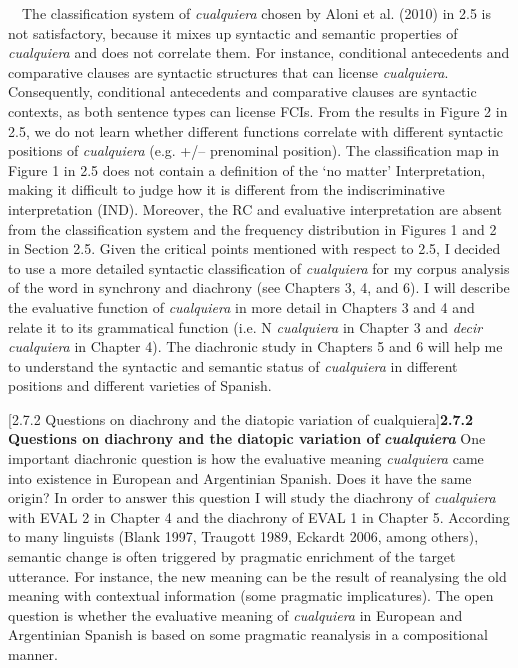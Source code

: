 \documentclass[10pt]{article}
\makeatletter
\renewcommand\subsubsection{\@startsection{subsubsection}{3}{0.0cm}{0in}{0.1mm}{\normalfont\normalsize\fontsize{12pt}{14.4pt}\selectfont}}
\newenvironment{styleStandard}{\renewcommand\baselinestretch{1.25}\setlength\leftskip{0cm}\setlength\rightskip{0cm}\setlength\parindent{0cm}\setlength\parfillskip{0pt plus 1fil}\setlength\parskip{0in plus 1pt}\writerlistparindent\writerlistleftskip\leavevmode\normalfont\normalsize\fontsize{12pt}{14.4pt}\selectfont\writerlistlabel\ignorespaces}{\unskip\vspace{0in plus 1pt}\par}
\newcommand\writerlistleftskip{}
\newcommand\writerlistparindent{}
\newcommand\writerlistlabel{}
\newcounter{Figure}
\makeatother
\begin{document}
\begin{styleStandard}
\ \ The classification system of \textit{cualquiera} chosen by Aloni et al. (2010) in 2.5 is not satisfactory, because it mixes up syntactic and semantic properties of \textit{cualquiera} and does not correlate them. For instance, conditional antecedents and comparative clauses are syntactic structures that can license \textit{cualquiera}. Consequently, conditional antecedents and comparative clauses are syntactic contexts, as both sentence types can license FCIs. From the results in Figure 2 in 2.5, we do not learn whether different functions correlate with different syntactic positions of \textit{cualquiera} (e.g. +/– prenominal position). The classification map in Figure 1 in 2.5 does not contain a definition of the ‘no matter’ Interpretation, making it difficult to judge how it is different from the indiscriminative interpretation (IND). Moreover, the RC and evaluative interpretation are absent from the classification system and the frequency distribution in Figures 1 and 2 in Section 2.5. Given the critical points mentioned with respect to 2.5, I decided to use a more detailed syntactic classification of \textit{cualquiera} for my corpus analysis of the word in synchrony and diachrony (see Chapters 3, 4, and 6). I will describe the evaluative function of \textit{cualquiera} in more detail in Chapters 3 and 4 and relate it to its grammatical function (i.e. N \textit{cualquiera} in Chapter 3 and \textit{decir cualquiera} in Chapter 4). The diachronic study in Chapters 5 and 6 will help me to understand the syntactic and semantic status of \textit{cualquiera} in different positions and different varieties of Spanish. 
\end{styleStandard}

\subsubsection[2.7.2 Questions on diachrony and the diatopic variation of cualquiera]{\textbf{2.7.2 Questions on diachrony and the diatopic variation of }\textbf{\textit{cualquiera}}}
\begin{styleStandard}
One important diachronic question is how the evaluative meaning \textit{cualquiera} came into existence in European and Argentinian Spanish. Does it have the same origin? In order to answer this question I will study the diachrony of \textit{cualquiera} with EVAL 2 in Chapter 4 and the diachrony of EVAL 1 in Chapter 5. According to many linguists (Blank 1997, Traugott 1989, Eckardt 2006, among others), semantic change is often triggered by pragmatic enrichment of the target utterance. For instance, the new meaning can be the result of reanalysing the old meaning with contextual information (some pragmatic implicatures). The open question is whether the evaluative meaning of \textit{cualquiera} in European and Argentinian Spanish is based on some pragmatic reanalysis in a compositional manner. 
\end{styleStandard}
\end{document}
